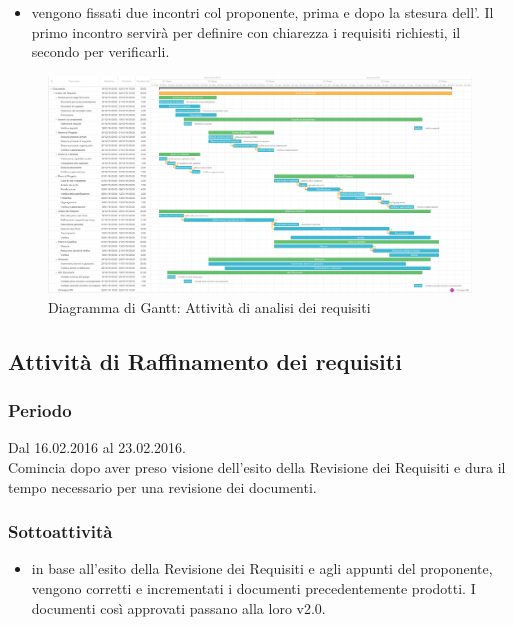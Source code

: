 \documentclass[a4paper, titlepage]{article}
\begin{document}
\begin{itemize}
		\item {} vengono fissati due incontri col proponente, prima e dopo la stesura dell'. Il primo incontro servirà per definire con chiarezza i requisiti richiesti, il secondo per verificarli.		 
	\end{itemize}
	
	\newpage
	\begin{figure}
		\includegraphics[scale=0.25]{Img/Grafici_Gantt/Analisi_dei_requisiti.pdf}
		\caption{ Diagramma di Gantt: Attività di analisi dei requisiti}
	\end{figure}
	
	\subsection{Attività di Raffinamento dei requisiti}
	\subsubsection{Periodo}
	Dal 16.02.2016 al 23.02.2016.\\
	Comincia dopo aver preso visione dell'esito della Revisione dei Requisiti e dura il tempo necessario per una revisione dei documenti.
	
	
	\subsubsection{Sottoattività}
	\begin{itemize}
		\item {} in base all'esito della Revisione dei Requisiti e agli appunti del proponente, vengono corretti e incrementati i documenti precedentemente prodotti. I documenti così approvati passano alla loro v2.0.
	\end{itemize}
	
\end{document}
